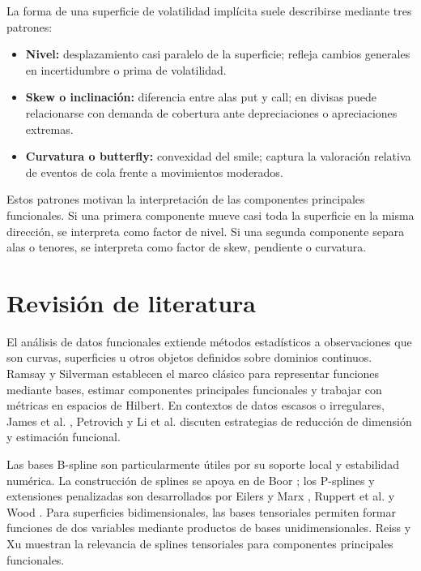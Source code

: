 \documentclass[a4paper,11pt]{article}
\newcommand{\SVI}{superficie de volatilidad implícita}
\begin{document}
La forma de una \SVI{} suele describirse mediante tres patrones:
\begin{itemize}
  \item \textbf{Nivel:} desplazamiento casi paralelo de la superficie; refleja cambios generales en incertidumbre o prima de volatilidad.
  \item \textbf{Skew o inclinación:} diferencia entre alas put y call; en divisas puede relacionarse con demanda de cobertura ante depreciaciones o apreciaciones extremas.
  \item \textbf{Curvatura o butterfly:} convexidad del smile; captura la valoración relativa de eventos de cola frente a movimientos moderados.
\end{itemize}
Estos patrones motivan la interpretación de las componentes principales funcionales. Si una primera componente mueve casi toda la superficie en la misma dirección, se interpreta como factor de nivel. Si una segunda componente separa alas o tenores, se interpreta como factor de skew, pendiente o curvatura.

\section{Revisión de literatura}

El análisis de datos funcionales extiende métodos estadísticos a observaciones que son curvas, superficies u otros objetos definidos sobre dominios continuos. Ramsay y Silverman \cite{RamsaySilverman2006} establecen el marco clásico para representar funciones mediante bases, estimar componentes principales funcionales y trabajar con métricas en espacios de Hilbert. En contextos de datos escasos o irregulares, James et al. \cite{JamesHastieSugar2000}, Petrovich \cite{Petrovich2018} y Li et al. \cite{Li2020} discuten estrategias de reducción de dimensión y estimación funcional.

Las bases B-spline son particularmente útiles por su soporte local y estabilidad numérica. La construcción de splines se apoya en de Boor \cite{DeBoor2001}; los P-splines y extensiones penalizadas son desarrollados por Eilers y Marx \cite{EilersMarx2003}, Ruppert et al. \cite{Ruppert2003} y Wood \cite{Wood2017}. Para superficies bidimensionales, las bases tensoriales permiten formar funciones de dos variables mediante productos de bases unidimensionales. Reiss y Xu \cite{ReissXu2020} muestran la relevancia de splines tensoriales para componentes principales funcionales.
\end{document}
